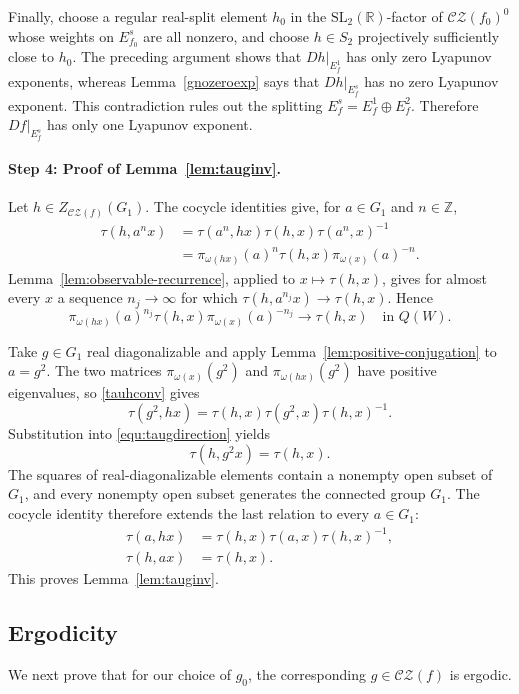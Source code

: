 \documentclass[11pt]{amsart}
\numberwithin{equation}{section}
\newcommand{\CZ}{\mathcal{CZ}}
\newcommand{\SL}{\mathrm{SL}}
\theoremstyle{plain}
\begin{document}
Finally, choose a regular real-split element
$h_0$ in the $\SL_2(\mathbb R)$-factor of $\CZ(f_0)^0$
whose weights on $E_{f_0}^s$ are all nonzero, and choose
$h\in S_2$ projectively sufficiently close to $h_0$. The preceding
argument shows that $Dh|_{E_f^1}$ has only zero Lyapunov exponents,
whereas Lemma~\ref{gnozeroexp} says that
$Dh|_{E_f^s}$ has no zero Lyapunov exponent. This contradiction rules
out the splitting $E_f^s=E_f^1\oplus E_f^2$. Therefore
$Df|_{E_f^s}$ has only one Lyapunov exponent.

\paragraph{\textbf{Step 4: Proof of Lemma~\ref{lem:tauginv}.}}
Let $h\in Z_{\CZ(f)}(G_1)$.  The cocycle identities give, for
$a\in G_1$ and $n\in\mathbb Z$,
\begin{align}
\tau(h,a^nx)
&=\tau(a^n,hx)\tau(h,x)\tau(a^n,x)^{-1}\nonumber\\
&=\pi_{\omega(hx)}(a)^n\tau(h,x)
        \pi_{\omega(x)}(a)^{-n}.
\label{equ:taugdirection}
\end{align}
Lemma~\ref{lem:observable-recurrence}, applied to
$x\mapsto\tau(h,x)$, gives for almost every $x$ a sequence
$n_j\to\infty$ for which $\tau(h,a^{n_j}x)\to\tau(h,x)$. Hence
\begin{equation}\label{tauhconv}
\pi_{\omega(hx)}(a)^{n_j}\tau(h,x)
 \pi_{\omega(x)}(a)^{-n_j}\longrightarrow\tau(h,x)
 \quad\text{in }Q(W).
\end{equation}

Take $g\in G_1$ real diagonalizable and apply
Lemma~\ref{lem:positive-conjugation} to $a=g^2$.  The two matrices
$\pi_{\omega(x)}(g^2)$ and $\pi_{\omega(hx)}(g^2)$ have positive
eigenvalues, so \eqref{tauhconv} gives
\[
\tau(g^2,hx)=\tau(h,x)\tau(g^2,x)\tau(h,x)^{-1}.
\]
Substitution into \eqref{equ:taugdirection} yields
\[
\tau(h,g^2x)=\tau(h,x).
\]
The squares of real-diagonalizable elements contain a nonempty open
subset of $G_1$, and every nonempty open subset generates the connected
group $G_1$.  The cocycle identity therefore extends the last relation
to every $a\in G_1$:
\begin{align}
\tau(a,hx)&=\tau(h,x)\tau(a,x)\tau(h,x)^{-1},\nonumber\\
\tau(h,ax)&=\tau(h,x).
\label{taufgequ}
\end{align}
This proves Lemma~\ref{lem:tauginv}.


\subsection{Ergodicity}\label{sec:gerg}
We next prove that for our choice of $g_0$, the corresponding $g\in \CZ(f)$ is ergodic.
\end{document}
